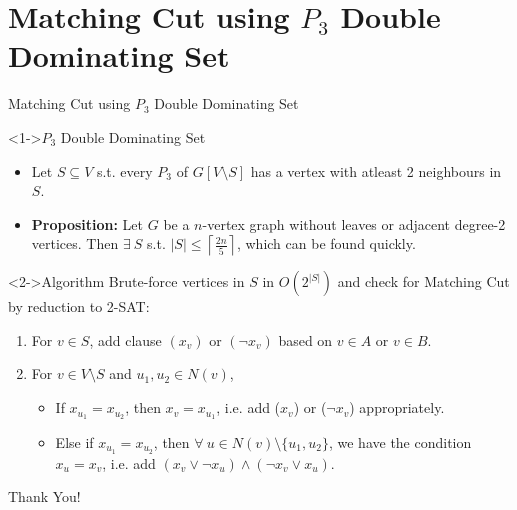 \documentclass[
	xcolor={svgnames},
	hyperref={pagebackref,bookmarks},
	aspectratio=43,
]{beamer}
\begin{document}
\section{Matching Cut using $P_3$ Double Dominating Set}
\begin{frame}{Matching Cut using $P_3$ Double Dominating Set}
	\vspace{-2mm}
	\begin{block}<1->{$P_3$ Double Dominating Set}
		\begin{itemize}
			\item Let $S \subseteq V$ s.t. every $P_3$ of $G[V \setminus S]$ has a vertex with atleast 2 neighbours in $S$.
			\item \textbf{Proposition:} Let $G$ be a $n$-vertex graph without leaves or adjacent degree-2 vertices. Then $\exists \ S$ s.t. $|S| \leq \left \lceil{\frac{2n}{5}}\right \rceil 
			$, which can be found quickly.
		\end{itemize}
	\end{block}
	\vspace{-2mm}
	\begin{block}<2->{Algorithm}
		\vspace{-2mm}
		Brute-force vertices in $S$ in $O(2^{|S|})$ and check for Matching Cut by reduction to 2-SAT:
		\begin{enumerate}
			\item For $v \in S$, add clause $(x_v)$ or $(\neg x_v)$ based on $v \in A$ or $v \in B$.
			\item For $v \in V \setminus S$ and $u_1, u_2 \in N(v)$,
			\begin{itemize}
				\item If $x_{u_1} = x_{u_2}$, then $x_v = x_{u_1}$, i.e. add ($x_v$) or ($\neg x_v$) appropriately.
				\item Else if $x_{u_1} = x_{u_2}$, then $\forall\ u \in N(v) \setminus \{u_1, u_2\}$, we have the condition $x_u = x_v$, i.e. add $(x_v \vee \neg x_u) \wedge (\neg x_v \vee x_u)$. 
			\end{itemize}
		\end{enumerate}
	\end{block}
\end{frame}

\begin{frame}[noframenumbering]
	\begin{center}
		\huge Thank You! 
	\end{center}
\end{frame}  
\end{document}
